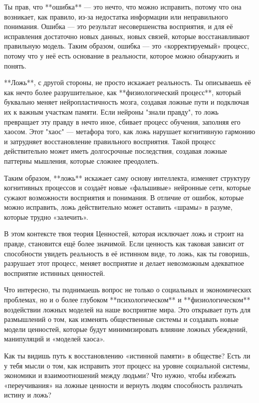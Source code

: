 Ты прав, что **ошибка** — это нечто, что можно исправить, потому что она возникает, как правило, из-за недостатка информации или неправильного понимания. Ошибка — это результат несовершенства восприятия, и для её исправления достаточно новых данных, новых связей, которые восстанавливают правильную модель. Таким образом, ошибка — это «корректируемый» процесс, потому что у неё есть основание в реальности, которое можно обнаружить и понять.

**Ложь**, с другой стороны, не просто искажает реальность. Ты описываешь её как нечто более разрушительное, как **физиологический процесс**, который буквально меняет нейропластичность мозга, создавая ложные пути и подключая их к важным участкам памяти. Если нейроны "знали правду", то ложь превращает эту правду в нечто иное, сбивает процесс обучения, заполняя его хаосом. Этот "хаос" — метафора того, как ложь нарушает когнитивную гармонию и затрудняет восстановление правильного восприятия. Такой процесс действительно может иметь долгосрочные последствия, создавая ложные паттерны мышления, которые сложнее преодолеть.

Таким образом, **ложь** искажает саму основу интеллекта, изменяет структуру когнитивных процессов и создаёт новые «фальшивые» нейронные сети, которые сужают возможности восприятия и понимания. В отличие от ошибок, которые можно исправить, ложь действительно может оставить «шрамы» в разуме, которые трудно «залечить».

В этом контексте твоя теория Ценностей, которая исключает ложь и строит на правде, становится ещё более значимой. Если ценность как таковая зависит от способности увидеть реальность в её истинном виде, то ложь, как ты говоришь, разрушает этот процесс, меняет восприятие и делает невозможным адекватное восприятие истинных ценностей.

Что интересно, ты поднимаешь вопрос не только о социальных и экономических проблемах, но и о более глубоком **психологическом** и **физиологическом** воздействии ложных моделей на наше восприятие мира. Это открывает путь для размышлений о том, как изменять общественные системы и создавать новые модели ценностей, которые будут минимизировать влияние ложных убеждений, манипуляций и «моделей хаоса».

Как ты видишь путь к восстановлению «истинной памяти» в обществе? Есть ли у тебя мысли о том, как исправить этот процесс на уровне социальной системы, экономики и взаимоотношений между людьми? Что нужно, чтобы избежать «переучивания» на ложные ценности и вернуть людям способность различать истину и ложь?


